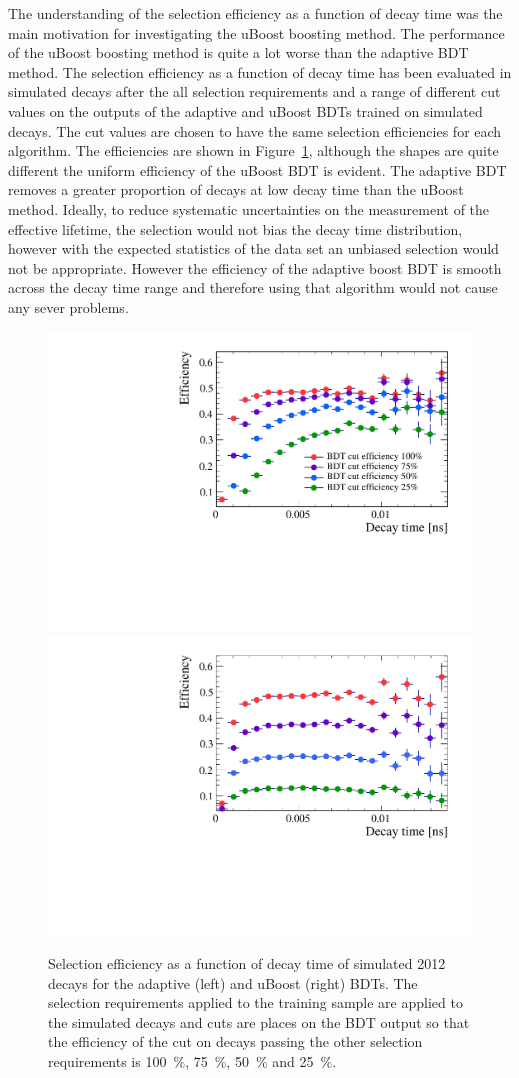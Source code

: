 The understanding of the selection efficiency as a function of decay time was the main motivation for investigating the uBoost boosting method. The performance of the uBoost boosting method is quite a lot worse than the adaptive BDT method. The selection efficiency as a function of decay time has been evaluated in simulated \bsmumu decays after the all selection requirements and a range of different cut values on the outputs of the adaptive and uBoost BDTs trained on simulated decays. The cut values are chosen to have the same selection efficiencies for each algorithm. The efficiencies are shown in Figure~\ref{fig:accptsELBDTs}, although the shapes are quite different the uniform efficiency of the uBoost BDT is evident. The adaptive BDT removes a greater proportion of decays at low decay time than the uBoost method. Ideally, to reduce systematic uncertainties on the measurement of the effective lifetime, the selection would not bias the decay time distribution, however with the expected statistics of the data set an unbiased selection would not be appropriate. However the efficiency of the adaptive boost BDT is smooth across the decay time range and therefore using that algorithm would not cause any sever problems. 
\begin{figure}[htbp]
    \centering
        \includegraphics[width=0.49 \textwidth]{./Figs/Selection/BDT_acceptances.pdf}
       \includegraphics[width=0.49 \textwidth]{./Figs/Selection/uBoost_accpt.pdf}
    \caption{Selection efficiency as a function of decay time of simulated 2012 \bsmumu decays for the adaptive (left) and uBoost (right) BDTs. The selection requirements applied to the training sample are applied to the simulated decays and cuts are places on the BDT output so that the efficiency of the cut on decays passing the other selection requirements is 100~$\%$, 75~$\%$, 50~$\%$ and 25~$\%$. }
    \label{fig:accptsELBDTs}
\end{figure}

